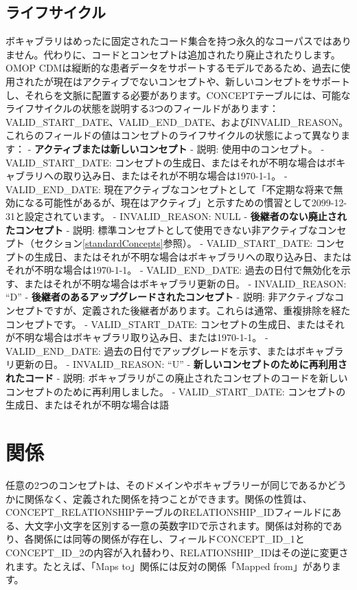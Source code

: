 \documentclass[
  11pt]{book}
\theoremstyle{definition}
\theoremstyle{definition}
\theoremstyle{definition}
\theoremstyle{definition}
\theoremstyle{remark}
\begin{document}
\subsection{ライフサイクル}\label{conceptLifeCycle}

ボキャブラリはめったに固定されたコード集合を持つ永久的なコーパスではありません。代わりに、コードとコンセプトは追加されたり廃止されたりします。OMOP CDMは縦断的な患者データをサポートするモデルであるため、過去に使用されたが現在はアクティブでないコンセプトや、新しいコンセプトをサポートし、それらを文脈に配置する必要があります。CONCEPTテーブルには、可能なライフサイクルの状態を説明する3つのフィールドがあります：VALID\_START\_DATE、VALID\_END\_DATE、およびINVALID\_REASON。これらのフィールドの値はコンセプトのライフサイクルの状態によって異なります：
- \textbf{アクティブまたは新しいコンセプト}
- 説明: 使用中のコンセプト。
- VALID\_START\_DATE: コンセプトの生成日、またはそれが不明な場合はボキャブラリへの取り込み日、またはそれが不明な場合は1970-1-1。
- VALID\_END\_DATE: 現在アクティブなコンセプトとして「不定期な将来で無効になる可能性があるが、現在はアクティブ」と示すための慣習として2099-12-31と設定されています。
- INVALID\_REASON: NULL
- \textbf{後継者のない廃止されたコンセプト}
- 説明: 標準コンセプトとして使用できない非アクティブなコンセプト（セクション\ref{standardConcepts}参照）。
- VALID\_START\_DATE: コンセプトの生成日、またはそれが不明な場合はボキャブラリへの取り込み日、またはそれが不明な場合は1970-1-1。
- VALID\_END\_DATE: 過去の日付で無効化を示す、またはそれが不明な場合はボキャブラリ更新の日。
- INVALID\_REASON: ``D''
- \textbf{後継者のあるアップグレードされたコンセプト}
- 説明: 非アクティブなコンセプトですが、定義された後継者があります。これらは通常、重複排除を経たコンセプトです。
- VALID\_START\_DATE: コンセプトの生成日、またはそれが不明な場合はボキャブラリ取り込み日、または1970-1-1。
- VALID\_END\_DATE: 過去の日付でアップグレードを示す、またはボキャブラリ更新の日。
- INVALID\_REASON: ``U''
- \textbf{新しいコンセプトのために再利用されたコード}
- 説明: ボキャブラリがこの廃止されたコンセプトのコードを新しいコンセプトのために再利用しました。
- VALID\_START\_DATE: コンセプトの生成日、またはそれが不明な場合は語

\section{関係}\label{ux95a2ux4fc2}

任意の2つのコンセプトは、そのドメインやボキャブラリーが同じであるかどうかに関係なく、定義された関係を持つことができます。関係の性質は、CONCEPT\_RELATIONSHIPテーブルのRELATIONSHIP\_IDフィールドにある、大文字小文字を区別する一意の英数字IDで示されます。関係は対称的であり、各関係には同等の関係が存在し、フィールドCONCEPT\_ID\_1とCONCEPT\_ID\_2の内容が入れ替わり、RELATIONSHIP\_IDはその逆に変更されます。たとえば、「Maps to」関係には反対の関係「Mapped from」があります。
\end{document}
